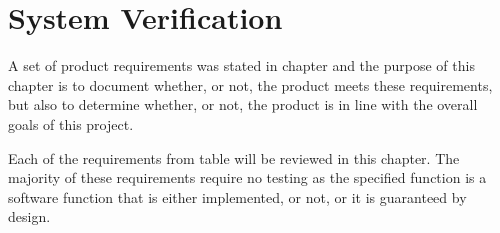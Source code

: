 \chapter{System Verification} \label{ch:SystemVerification}
A set of product requirements was stated in chapter  and the purpose of this chapter is to document whether, or not, the product meets these requirements, but also to determine whether, or not, the product is in line with the overall goals of this project.

Each of the requirements from table  will be reviewed in this chapter. The majority of these requirements require no testing as the specified function is a software function that is either implemented, or not, or it is guaranteed by design. 
